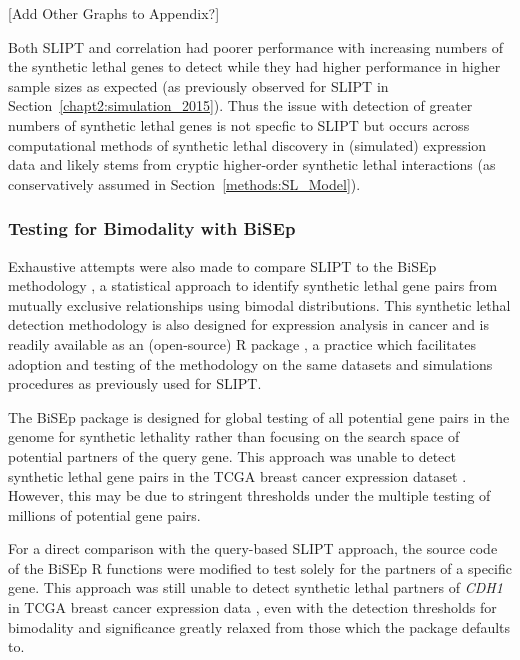 [Add Other Graphs to Appendix?]


Both \gls{SLIPT} and correlation had poorer performance with increasing numbers of the synthetic lethal genes to detect while they had higher performance in higher sample sizes as expected (as previously observed for \gls{SLIPT} in Section~\ref{chapt2:simulation_2015}). Thus the issue with detection of greater numbers of synthetic lethal genes is not specfic to \gls{SLIPT} but occurs across computational methods of synthetic lethal discovery in (simulated) expression data and likely stems from cryptic higher-order synthetic lethal interactions (as conservatively assumed in Section~\ref{methods:SL_Model}). 
    
\FloatBarrier

\subsubsection{Testing for Bimodality with BiSEp}
\label{chapt5:compare_bisep}

Exhaustive attempts were also made to compare \gls{SLIPT} to the \gls{BiSEp} methodology \citep{Wappett2016}, a statistical approach to identify synthetic lethal gene pairs from mutually exclusive relationships using bimodal distributions. This synthetic lethal detection methodology is also designed for expression analysis in cancer and is readily available as an (open-source) R package \citep{Wappett2014}, a practice which facilitates adoption and testing of the methodology on the same datasets and simulations procedures as previously used for \gls{SLIPT}.

The \gls{BiSEp} package is designed for global testing of all potential gene pairs in the genome for synthetic lethality rather than focusing on the search space of  potential partners of the query gene. This approach was unable to detect synthetic lethal gene pairs in the TCGA breast cancer expression dataset \citep{TCGA2012}. However, this may be due to stringent thresholds under the multiple testing of millions of potential gene pairs.

For a direct comparison with the query-based \gls{SLIPT} approach, the source code of the \gls{BiSEp} R functions were modified to test solely for the partners of a specific gene. This approach was still unable to detect synthetic lethal partners of \textit{CDH1} in TCGA breast cancer expression data \citep{TCGA2012}, even with the detection thresholds for bimodality and significance greatly relaxed from those which the package defaults to.

